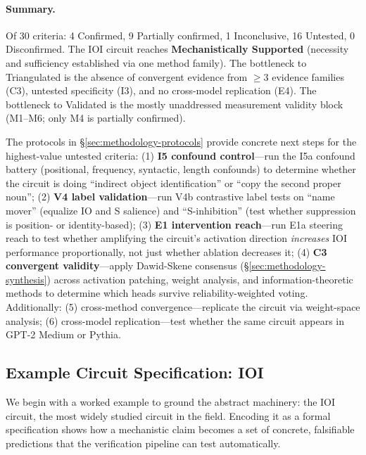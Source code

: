 \documentclass{article}
\begin{document}
\paragraph{Summary.} Of 30 criteria: 4 Confirmed, 9 Partially confirmed, 1 Inconclusive, 16 Untested, 0 Disconfirmed. The IOI circuit reaches \textbf{Mechanistically Supported} (necessity and sufficiency established via one method family). The bottleneck to Triangulated is the absence of convergent evidence from $\geq 3$ evidence families (C3), untested specificity (I3), and no cross-model replication (E4). The bottleneck to Validated is the mostly unaddressed measurement validity block (M1--M6; only M4 is partially confirmed).

The protocols in \S\ref{sec:methodology-protocols} provide concrete next steps for the highest-value untested criteria: (1) \textbf{I5 confound control}---run the I5a confound battery (positional, frequency, syntactic, length confounds) to determine whether the circuit is doing ``indirect object identification'' or ``copy the second proper noun''; (2) \textbf{V4 label validation}---run V4b contrastive label tests on ``name mover'' (equalize IO and S salience) and ``S-inhibition'' (test whether suppression is position- or identity-based); (3) \textbf{E1 intervention reach}---run E1a steering reach to test whether amplifying the circuit's activation direction \emph{increases} IOI performance proportionally, not just whether ablation decreases it; (4) \textbf{C3 convergent validity}---apply Dawid-Skene consensus (\S\ref{sec:methodology-synthesis}) across activation patching, weight analysis, and information-theoretic methods to determine which heads survive reliability-weighted voting. Additionally: (5) cross-method convergence---replicate the circuit via weight-space analysis; (6) cross-model replication---test whether the same circuit appears in GPT-2 Medium or Pythia.

\subsection{Example Circuit Specification: IOI}

\label{appendix:ioi-detail}

We begin with a worked example to ground the abstract machinery: the IOI circuit,
the most widely studied circuit in the field.
Encoding it as a formal specification  shows how a mechanistic claim becomes a set of concrete, falsifiable predictions that the verification pipeline can test automatically.
\end{document}
